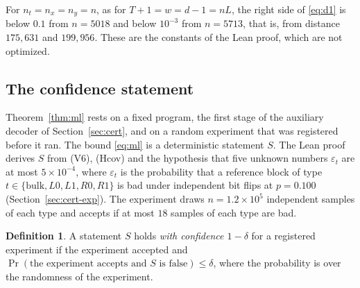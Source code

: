 \documentclass[11pt]{amsart}
\theoremstyle{definition}
\newtheorem{definition}[theorem]{Definition}
\theoremstyle{remark}
\numberwithin{equation}{section}
\begin{document}
For $n_t=n_x=n_y=n$, as for $T+1=w=d-1=nL$, the right side of \eqref{eq:d1} is below $0.1$ from $n=5018$ and below $10^{-3}$ from $n=5713$, that is, from distance $175{,}631$ and $199{,}956$. These are the constants of the Lean proof, which are not optimized.


\subsection{The confidence statement}\label{sec:conf}
Theorem~\ref{thm:ml} rests on a fixed program, the first stage of the auxiliary decoder of Section~\ref{sec:cert}, and on a random experiment that was registered before it ran. The bound \eqref{eq:ml} is a deterministic statement $S$. The Lean proof derives $S$ from (V6), (Hcov) and the hypothesis that five unknown numbers $\varepsilon_t$ are at most $5\times10^{-4}$, where $\varepsilon_t$ is the probability that a reference block of type $t\in\{\mathrm{bulk},L0,L1,R0,R1\}$ is bad under independent bit flips at $p=0.100$ (Section~\ref{sec:cert-exp}). The experiment draws $n=1.2\times10^{5}$ independent samples of each type and accepts if at most $18$ samples of each type are bad.

\begin{definition}\label{def:conf}
A statement $S$ holds \emph{with confidence $1-\delta$} for a registered experiment if the experiment accepted and
$\Pr(\text{the experiment accepts and } S \text{ is false})\le\delta$,
where the probability is over the randomness of the experiment.
\end{definition}
\end{document}

